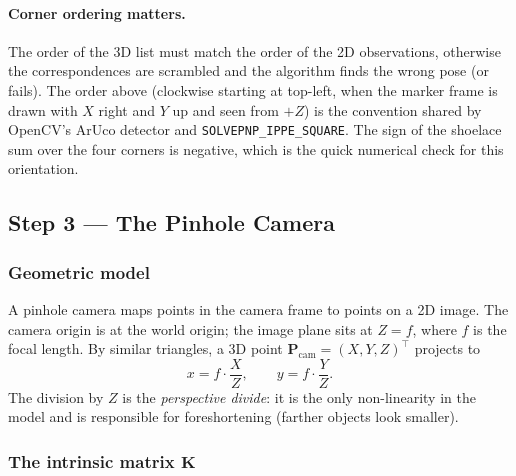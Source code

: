 \documentclass[11pt,a4paper]{article}
\theoremstyle{definition}
\theoremstyle{plain}
\theoremstyle{remark}
\newcommand{\flag}{\texttt{SOLVEPNP\allowbreak\_IPPE\allowbreak\_SQUARE}}
\newcommand{\Pcam}{\mathbf{P}_{\text{cam}}}
\newcommand{\KK}{\mathbf{K}}
\begin{document}
\paragraph{Corner ordering matters.}
The order of the 3D list must match the order of the 2D observations,
otherwise the correspondences are scrambled and the algorithm finds the
wrong pose (or fails). The order above (clockwise starting at top-left, when
the marker frame is drawn with $X$ right and $Y$ up and seen from $+Z$) is the
convention shared by OpenCV's ArUco detector and \flag.
The sign of the shoelace sum over the four corners is negative, which is the
quick numerical check for this orientation.

\subsection{Step 3 --- The Pinhole Camera}

\subsubsection{Geometric model}

A pinhole camera maps points in the camera frame to points on a 2D image.
The camera origin is at the world origin; the image plane sits at $Z = f$,
where $f$ is the focal length. By similar triangles, a 3D point
$\Pcam = (X, Y, Z)^\top$ projects to
\begin{equation}
  x = f\cdot\frac{X}{Z}, \qquad y = f\cdot\frac{Y}{Z}.
  \label{eq:similar-triangles}
\end{equation}
The division by $Z$ is the \emph{perspective divide}: it is the only
non-linearity in the model and is responsible for foreshortening (farther
objects look smaller).

\subsubsection{The intrinsic matrix \texorpdfstring{$\KK$}{K}}
\end{document}
